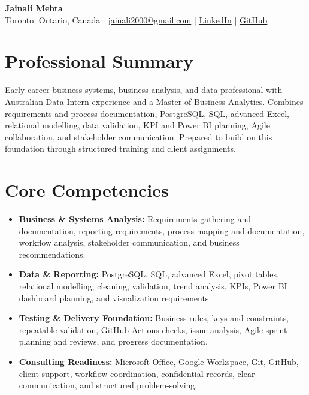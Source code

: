 \documentclass[letterpaper,10pt]{article}
\begin{document}
\begin{center}
  {\fontsize{17}{19}\selectfont\textbf{Jainali Mehta}}\\[2pt]
  \small Toronto, Ontario, Canada \;|\;
  \href{mailto:jainali2000@gmail.com}{jainali2000@gmail.com} \;|\;
  \href{https://www.linkedin.com/in/jainali-mehta}{LinkedIn} \;|\;
  \href{https://github.com/jainalimehta}{GitHub}
\end{center}
\vspace{-7pt}

\section{Professional Summary}
\small Early-career business systems, business analysis, and data professional with Australian Data Intern experience and a Master of Business Analytics. Combines requirements and process documentation, PostgreSQL, SQL, advanced Excel, relational modelling, data validation, KPI and Power BI planning, Agile collaboration, and stakeholder communication. Prepared to build on this foundation through structured training and client assignments.

\section{Core Competencies}
\begin{itemize}[leftmargin=0.16in,label=\textbullet,topsep=0pt,itemsep=1pt,parsep=0pt]
  \item \small \textbf{Business \& Systems Analysis:} Requirements gathering and documentation, reporting requirements, process mapping and documentation, workflow analysis, stakeholder communication, and business recommendations.
  \item \small \textbf{Data \& Reporting:} PostgreSQL, SQL, advanced Excel, pivot tables, relational modelling, cleaning, validation, trend analysis, KPIs, Power BI dashboard planning, and visualization requirements.
  \item \small \textbf{Testing \& Delivery Foundation:} Business rules, keys and constraints, repeatable validation, GitHub Actions checks, issue analysis, Agile sprint planning and reviews, and progress documentation.
  \item \small \textbf{Consulting Readiness:} Microsoft Office, Google Workspace, Git, GitHub, client support, workflow coordination, confidential records, clear communication, and structured problem-solving.
\end{itemize}
\end{document}
